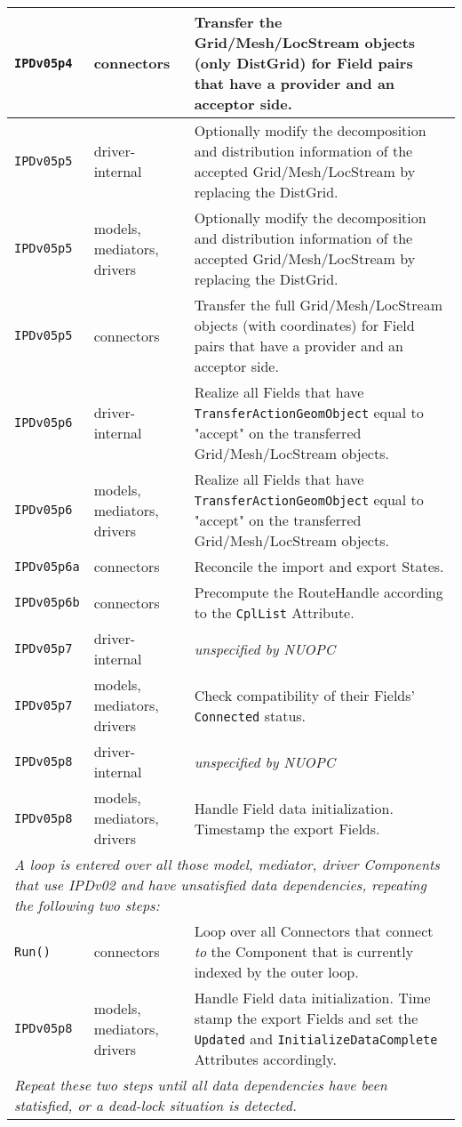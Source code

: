 \begin{longtable}[h]{|p{35mm}|p{4cm}|p{6cm}|}
     {\tt IPDv05p4}   & connectors                  & Transfer the Grid/Mesh/LocStream objects (only DistGrid) for Field pairs that have a provider and an acceptor side.\\ \hline
     {\tt IPDv05p5}   & driver-internal             & Optionally modify the decomposition and distribution information of the accepted Grid/Mesh/LocStream by replacing the DistGrid.\\ \hline
     {\tt IPDv05p5}   & models, mediators, drivers  & Optionally modify the decomposition and distribution information of the accepted Grid/Mesh/LocStream by replacing the DistGrid.\\ \hline
     {\tt IPDv05p5}   & connectors                  & Transfer the full Grid/Mesh/LocStream objects (with coordinates) for Field pairs that have a provider and an acceptor side.\\ \hline
     {\tt IPDv05p6}   & driver-internal             & Realize all Fields that have {\tt TransferActionGeomObject} equal to "accept" on the transferred Grid/Mesh/LocStream objects.\\ \hline
     {\tt IPDv05p6}   & models, mediators, drivers  & Realize all Fields that have {\tt TransferActionGeomObject} equal to "accept" on the transferred Grid/Mesh/LocStream objects.\\ \hline
     {\tt IPDv05p6a}  & connectors                  & Reconcile the import and export States.\\ \hline
     {\tt IPDv05p6b}  & connectors                  & Precompute the RouteHandle according to the {\tt CplList} Attribute.\\ \hline
     {\tt IPDv05p7}   & driver-internal             & {\em unspecified by NUOPC}\\ \hline
     {\tt IPDv05p7}   & models, mediators, drivers  & Check compatibility of their Fields' {\tt Connected} status.\\ \hline
     {\tt IPDv05p8}   & driver-internal             & {\em unspecified by NUOPC}\\ \hline
     {\tt IPDv05p8}   & models, mediators, drivers  & Handle Field data initialization. Timestamp the export Fields.\\ \hline
     \multicolumn{3}{|p{13.5cm}|}{\it A loop is entered over all those model, mediator, driver Components that use IPDv02 and have
     unsatisfied data dependencies, repeating the following two steps:}\\ \hline
     {\tt Run()}      & connectors                  & Loop over all Connectors that connect {\it to} the Component that is currently indexed by the outer loop.\\ \hline
     {\tt IPDv05p8}   & models, mediators, drivers  & Handle Field data initialization. Time stamp the export Fields and set the {\tt Updated} and {\tt InitializeDataComplete} Attributes accordingly.\\ \hline
     \multicolumn{3}{|p{13.5cm}|}{\it Repeat these two steps until all data
     dependencies have been statisfied, or a dead-lock situation is detected.}\\ 
     \hline\hline
\end{longtable}
